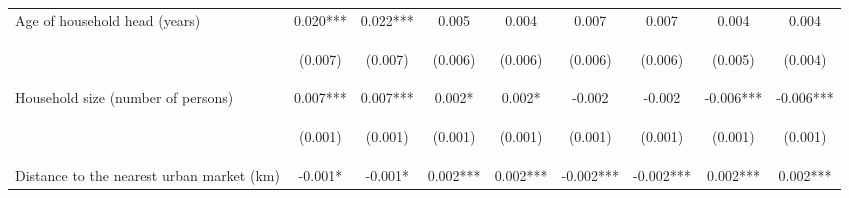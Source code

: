 \begin{center}
\begin{tabular}{lcccccccc}
Age of household head (years) & 0.020*** & 0.022*** & 0.005 & 0.004 & 0.007 & 0.007 & 0.004 & 0.004 \\
\vspace{4pt} & \begin{footnotesize}(0.007)\end{footnotesize} & \begin{footnotesize}(0.007)\end{footnotesize} & \begin{footnotesize}(0.006)\end{footnotesize} & \begin{footnotesize}(0.006)\end{footnotesize} & \begin{footnotesize}(0.006)\end{footnotesize} & \begin{footnotesize}(0.006)\end{footnotesize} & \begin{footnotesize}(0.005)\end{footnotesize} & \begin{footnotesize}(0.004)\end{footnotesize} \\
Household size (number of persons) & 0.007*** & 0.007*** & 0.002* & 0.002* & -0.002 & -0.002 & -0.006*** & -0.006*** \\
\vspace{4pt} & \begin{footnotesize}(0.001)\end{footnotesize} & \begin{footnotesize}(0.001)\end{footnotesize} & \begin{footnotesize}(0.001)\end{footnotesize} & \begin{footnotesize}(0.001)\end{footnotesize} & \begin{footnotesize}(0.001)\end{footnotesize} & \begin{footnotesize}(0.001)\end{footnotesize} & \begin{footnotesize}(0.001)\end{footnotesize} & \begin{footnotesize}(0.001)\end{footnotesize} \\
Distance to the nearest urban market (km) & -0.001* & -0.001* & 0.002*** & 0.002*** & -0.002*** & -0.002*** & 0.002*** & 0.002*** \\

\end{tabular}
\end{center}
